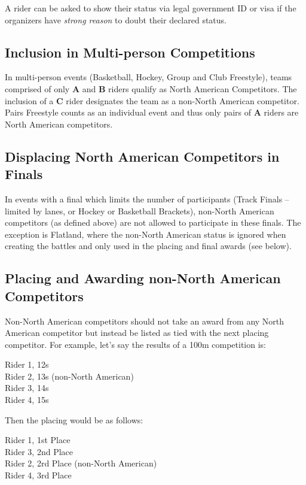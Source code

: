 A rider can be asked to show their status via legal government ID or visa if the organizers have \textit{strong reason} to doubt their declared status.

\subsection{Inclusion in Multi-person Competitions}

In multi-person events (Basketball, Hockey, Group and Club Freestyle), teams comprised of only \textbf{A} and \textbf{B} riders qualify as North American Competitors.
The inclusion of a \textbf{C} rider designates the team as a non-North American competitor.
Pairs Freestyle counts as an individual event and thus only pairs of \textbf{A} riders are North American competitors.

\subsection{Displacing North American Competitors in Finals}

In events with a final which limits the number of participants (Track Finals -- limited by lanes, or Hockey or Basketball Brackets), non-North American competitors (as defined above) are not allowed to participate in these finals.
The exception is Flatland, where the non-North American status is ignored when creating the battles and only used in the placing and final awards (see below).

\subsection{Placing and Awarding non-North American Competitors}

Non-North American competitors should not take an award from any North American competitor but instead be listed as tied with the next placing competitor.
For example, let's say the results of a 100m competition is:

Rider 1, 12s \\
Rider 2, 13s (non-North American) \\
Rider 3, 14s \\
Rider 4, 15s

Then the placing would be as follows:

Rider 1, 1st Place \\
Rider 3, 2nd Place \\
Rider 2, 2rd Place (non-North American) \\
Rider 4, 3rd Place

